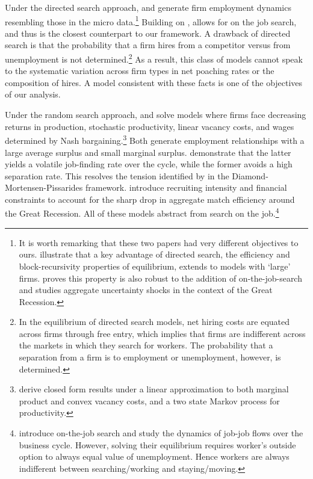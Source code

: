 Under the directed search approach, \citet{KassKircher} and \citet{schaal2017uncertainty} generate firm employment dynamics resembling those in the micro data.\footnote{
    It is worth remarking that these two papers had very different objectives to ours.
    \citet{KassKircher} illustrate that a key advantage of directed search, the efficiency and block-recursivity properties of equilibrium, extends to models with `large' firms.
    \citet{schaal2017uncertainty} proves this property is also robust to the addition of on-the-job-search and studies aggregate uncertainty shocks in the context of the Great Recession.}
Building on \citet{menzio2011efficient}, \citet{schaal2017uncertainty} allows for on the job search, and thus is the closest counterpart to our framework.
A drawback of directed search is that the probability that a firm hires from a competitor versus from unemployment is not determined.\footnote{
    In the equilibrium of directed search models, net hiring costs are equated across firms through free entry, which implies that firms are indifferent across the markets in which they search for workers.
    The probability that a separation from a firm is to employment or unemployment, however, is determined.
}
As a result, this class of models cannot speak to the systematic variation across firm types in net poaching rates or the composition of hires.
A model consistent with these facts is one of the objectives of our analysis.

Under the random search approach, \citet{ElsbyMichaelsAEJ} and \citet{acemogluhawkins} solve models where firms face decreasing returns in production, stochastic productivity, linear vacancy costs, and wages determined by Nash bargaining.\footnote{
    \citet{BertolaCaballero1994} derive closed form results under a linear approximation to both marginal product and convex vacancy costs, and a two state Markov process for productivity.
}
Both generate employment relationships with a large average surplus and small marginal surplus.
\citet{ElsbyMichaelsAEJ} demonstrate that the latter yields a volatile job-finding rate over the cycle, while the former avoids a high separation rate.
This resolves the tension identified by \citet{ShimerAER} in the Diamond-Mortensen-Pissarides framework.
\citet{Gavazza2018} introduce recruiting intensity and financial constraints to account for the sharp drop in aggregate match efficiency around the Great Recession.
All of these models abstract from search on the job.\footnote{
    \citet{fujitanakajimaworker2016} introduce on-the-job search and study the dynamics of job-job flows over the business cycle.
    However, solving their equilibrium requires worker's outside option to always equal value of unemployment.
    Hence workers are always indifferent between searching/working and staying/moving.}


